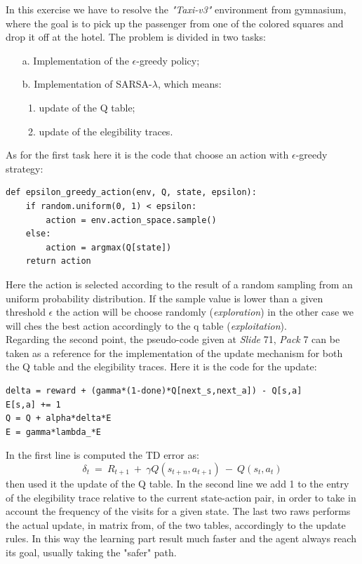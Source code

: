 \documentclass[10pt,a4paper]{article}
\begin{document}
In this exercise we have to resolve the \textit{"Taxi-v3"} environment from gymnasium, where the goal is to pick up the passenger from one of the colored squares and drop it off at the hotel. The problem is divided in two tasks:
\begin{itemize}
    \item[a.] Implementation of the $\epsilon$-greedy policy;
    \item[b.] Implementation of SARSA-$\lambda$, which means:
    \begin{enumerate}
        \item update of the Q table;
        \item update of the elegibility traces.
    \end{enumerate}
\end{itemize}
\vspace{5pt}

\noindent As for the first task here it is the code that choose an action with $\epsilon$-greedy strategy:
\begin{lstlisting}
def epsilon_greedy_action(env, Q, state, epsilon):
    if random.uniform(0, 1) < epsilon:
        action = env.action_space.sample()  
    else:
        action = argmax(Q[state])
    return action
\end{lstlisting}
\vspace{5pt}

\noindent Here the action is selected according to the result of a random sampling from an uniform probability distribution. If the sample value is lower than a given threshold $\epsilon$ the action will be choose randomly (\textit{exploration}) in the other case we will ches the best action accordingly to the q table (\textit{exploitation}).\\

\noindent Regarding the second point, the pseudo-code given at \textit{Slide} 71, \textit{Pack} 7 can be taken as a reference for the implementation of the update mechanism for both the Q table and the elegibility traces. Here it is the code for the update:
\begin{lstlisting}
delta = reward + (gamma*(1-done)*Q[next_s,next_a]) - Q[s,a]
E[s,a] += 1
Q = Q + alpha*delta*E
E = gamma*lambda_*E
\end{lstlisting}
In the first line is computed the TD error as: 
\begin{equation}
    \delta_t  \:=\: R_{t+1} \:+\: \gamma Q(s_{t+n}, a_{t+1}) \:-\: Q(s_t, a_t)
\end{equation}
then used it the update of the Q table. In the second line we add 1 to the entry of the elegibility trace relative to the current state-action pair, in order to take in account the frequency of the visits for a given state. The last two raws performs the actual update, in matrix from, of the two tables, accordingly to the update rules. In this way the learning part result much faster and the agent always reach its goal, usually taking the "safer" path.
\newpage
\end{document}
